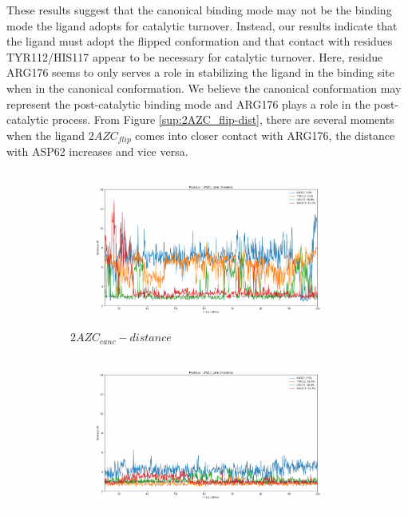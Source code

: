 \documentclass[fleqn,10pt]{wlscirep}
\begin{document}
These results suggest that the canonical binding mode may not be the binding mode the ligand adopts for catalytic turnover.
Instead, our results indicate that the ligand must adopt the flipped conformation and that contact with residues TYR112/HIS117 appear to be necessary for catalytic turnover.
Here, residue ARG176 seems to only serves a role in stabilizing the ligand in the binding site when in the canonical conformation.
We believe the canonical conformation may represent the post-catalytic binding mode and ARG176 plays a role in the post-catalytic process.
From Figure \ref{sup:2AZC_flip-dist}, there are several moments when the ligand $2AZC_{flip}$ comes into closer contact with ARG176, the distance with ASP62 increases and vice versa.

\begin{figure}[!ht]
\centering
   \begin{subfigure}{.45\textwidth}
     \centering
     \includegraphics[width=.95\linewidth]{2AZC_canc/2AZC_canc-dist_3.pdf}
     \caption{$2AZC_{canc}-distance$}
     \label{fig:2AZC_canc-dist}
   \end{subfigure}
   \begin{subfigure}{.45\textwidth}
     \centering
     \includegraphics[width=.95\linewidth]{2AZU_canc/2AZU_canc-dist_4.pdf}

\end{subfigure}
\end{figure}
\end{document}
